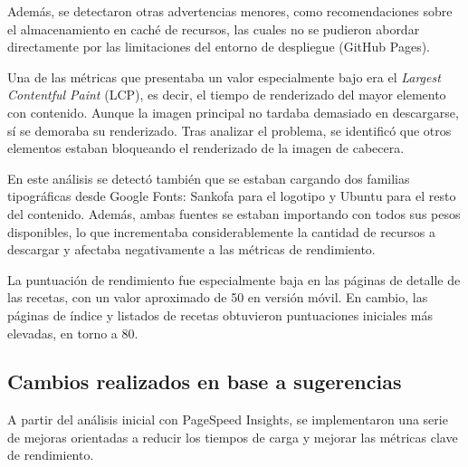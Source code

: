 \documentclass{article}
\begin{document}
Además, se detectaron otras advertencias menores, como recomendaciones sobre el almacenamiento en caché de recursos, las cuales no se pudieron abordar directamente por las limitaciones del entorno de despliegue (GitHub Pages).

Una de las métricas que presentaba un valor especialmente bajo era el \textit{Largest Contentful Paint} (LCP), es decir, el tiempo de renderizado del mayor elemento con contenido. Aunque la imagen principal no tardaba demasiado en descargarse, sí se demoraba su renderizado. Tras analizar el problema, se identificó que otros elementos estaban bloqueando el renderizado de la imagen de cabecera.

En este análisis se detectó también que se estaban cargando dos familias tipográficas desde Google Fonts: Sankofa para el logotipo y Ubuntu para el resto del contenido. Además, ambas fuentes se estaban importando con todos sus pesos disponibles, lo que incrementaba considerablemente la cantidad de recursos a descargar y afectaba negativamente a las métricas de rendimiento.

La puntuación de rendimiento fue especialmente baja en las páginas de detalle de las recetas, con un valor aproximado de 50 en versión móvil. En cambio, las páginas de índice y listados de recetas obtuvieron puntuaciones iniciales más elevadas, en torno a 80.

\subsection{Cambios realizados en base a sugerencias}\label{subsec:cambios-realizados}

A partir del análisis inicial con PageSpeed Insights, se implementaron una serie de mejoras orientadas a reducir los tiempos de carga y mejorar las métricas clave de rendimiento.
\end{document}
